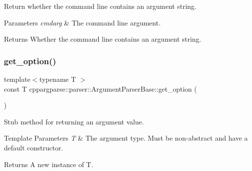 Return whether the command line contains an argument string. 


\begin{DoxyParams}{Parameters}
{\em cmdarg} & The command line argument.\\
\hline
\end{DoxyParams}
\begin{DoxyReturn}{Returns}
Whether the command line contains an argument string. 
\end{DoxyReturn}
\mbox{\label{classcppargparse_1_1parser_1_1ArgumentParserBase_ae26532c710a553810a784d2243572e34}} 
\subsubsection{\texorpdfstring{get\+\_\+option()}{get\_option()}\hspace{0.1cm}{\footnotesize\ttfamily [1/2]}}
{\footnotesize\ttfamily template$<$typename T $>$ \\
const T cppargparse\+::parser\+::\+Argument\+Parser\+Base\+::get\+\_\+option (\begin{DoxyParamCaption}\item[{const \hyperlink{structcppargparse_1_1types_1_1CommandLineArgument__t}{types\+::\+Command\+Line\+Argument\+\_\+t} \&}]{ }\end{DoxyParamCaption})\hspace{0.3cm}{\ttfamily [inline]}}



Stub method for returning an argument value. 


\begin{DoxyTemplParams}{Template Parameters}
{\em T} & The argument type. Must be non-\/abstract and have a default constructor.\\
\hline
\end{DoxyTemplParams}
\begin{DoxyReturn}{Returns}
A new instance of T. 
\end{DoxyReturn}
\mbox{\label{classcppargparse_1_1parser_1_1ArgumentParserBase_ae5f8dfec70ef927bc315e39046dcf63e}} 
